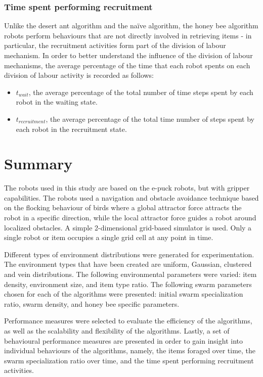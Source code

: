 \subsubsection{Time spent performing recruitment}
Unlike the desert ant algorithm and the na\"ive algorithm, the honey bee algorithm robots perform behaviours that are not directly involved in retrieving items - in particular, the recruitment activities form part of the division of labour mechanism. In order to better understand the influence of the division of labour mechanisms, the average percentage of the time that each robot spents on each division of labour activity is recorded as follows:

\begin{itemize}
\item $t_{wait}$, the average percentage of the total number of time steps spent by each robot in the waiting state.
\item $t_{recruitment}$, the average percentage of the total time number of steps spent by each robot in the recruitment state.
\end{itemize}



\section{Summary}
\label{third:summary}
The robots used in this study are based on the e-puck robots, but with gripper capabilities. The robots used a navigation and obstacle avoidance technique based on the flocking behaviour of birds where a global attractor force attracts the robot in a specific direction, while the local attractor force guides a robot around localized obstacles. A simple 2-dimensional grid-based simulator is used. Only a single robot or item occupies a single grid cell at any point in time.

Different types of environment distributions were generated for experimentation. The environment types that have been created are uniform, Gaussian, clustered and vein distributions. The following environmental parameters were varied: item density, environment size, and item type ratio. The following swarm parameters chosen for each of the algorithms were presented: initial swarm specialization ratio, swarm density, and honey bee specific parameters.

Performance measures were selected to evaluate the efficiency of the algorithms, as well as the scalability and flexibility of the algorithms. Lastly, a set of behavioural performance measures are presented in order to gain insight into individual behaviours of the algorithms, namely, the items foraged over time, the swarm specialization ratio over time, and the time spent performing recruitment activities.

